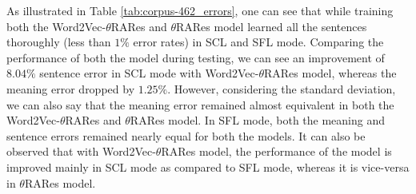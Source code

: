 As illustrated in Table \ref{tab:corpus-462_errors}, one can see that while training both the Word2Vec-$\theta$RARes and $\theta$RARes model learned all the sentences thoroughly (less than $ 1\% $ error rates) in SCL and  SFL mode. Comparing the performance of both the model during testing, we can see an improvement of $8.04 \%$ sentence error in SCL mode with Word2Vec-$\theta$RARes model, whereas the meaning error dropped by $1.25 \%$. However, considering the standard deviation, we can also say that the meaning error remained almost equivalent in both the Word2Vec-$\theta$RARes and $\theta$RARes model. In SFL mode, both the meaning and sentence errors remained nearly equal for both the models. It can also be observed that with Word2Vec-$\theta$RARes model, the performance of the model is improved mainly in SCL mode as compared to SFL mode, whereas it is vice-versa in $\theta$RARes model. 

